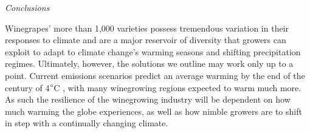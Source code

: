 \documentclass[11pt,letterpaper]{article}
\begin{document}

\emph{Conclusions}

Winegrapes' more than 1,000 varieties possess tremendous variation in their responses to climate and are a major reservoir of diversity that growers can exploit to adapt to climate change's warming seasons and shifting precipitation regimes. Ultimately, however, the solutions we outline may work only up to a point. Current emissions scenarios predict an average warming by the end of the century of 4$\degree$C \citep{ipcc2013}, with many winegrowing regions expected to warm much more. As such the resilience of the winegrowing industry will be dependent on how much warming the globe experiences, as well as how nimble growers are to shift in step with a continually changing climate. 









\end{document}
